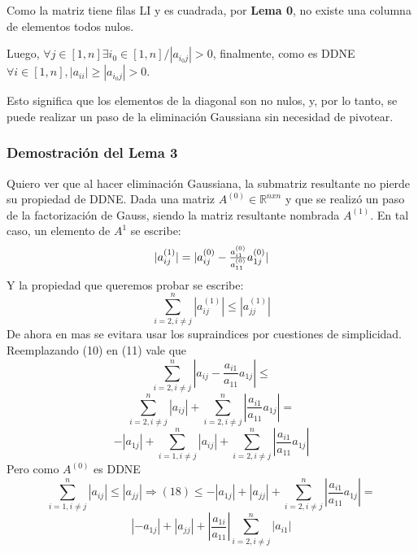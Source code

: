 Como la matriz tiene filas LI y es cuadrada, por \textbf{Lema 0}, no existe una columna de elementos todos nulos. 

Luego, $\forall j \in [1, n] \exists i_0 \in [1, n] / |a_{i_0 j}| > 0$, finalmente, como es DDNE $\forall i \in [1, n], |a_{ii}| \geq |a_{i_0 j}| > 0$. 

Esto significa que los elementos de la diagonal son no nulos, y, por lo tanto, se puede realizar un paso de la eliminación Gaussiana sin necesidad de pivotear.

\subsubsection{Demostración del Lema 3}
Quiero ver que al hacer eliminación Gaussiana, la submatriz resultante no pierde su propiedad de DDNE. Dada una matriz  $A^{(0)} \in \mathbb{R}^{nxn}$ y que se realizó un paso de la factorización de Gauss, siendo la matriz resultante nombrada $A^{(1)}$. En tal caso, un elemento de $A^{1}$ se escribe:
\\
\begin{equation*}
\centerline{$|a^{(1)}_{ij}| = |a^{(0)}_{ij} - \frac{a^{(0)}_{i1}}{a^{(0)}_{11}}  a^{(0)}_{1j}|$}
\end{equation*}
Y la propiedad que queremos probar se escribe:
\\
\begin{equation*} 
\sum_{i=2, i \neq j}^{n}  |a^{(1)}_{ij}| \leq |a^{(1)}_{jj}| 
\end{equation*}
De ahora en mas se evitara usar los supraindices por cuestiones de simplicidad. Reemplazando (10) en (11) vale que
\begin{equation*} 
\sum_{i=2, i \neq j}^{n}  |a_{ij} - \frac{a_{i1}}{a_{11}}  a_{1j}|  \leq
\end{equation*}
\begin{equation*} 
\sum_{i=2, i \neq j}^{n}  |a_{ij}| + \sum_{i=2, i \neq j}^{n}  |\frac{a_{i1}}{a_{11}}  a_{1j}|  =
\end{equation*}
\begin{equation*} 
-|a_{1j}| + \sum_{i=1, i \neq j}^{n}  |a_{ij}| + \sum_{i=2, i \neq j}^{n}  |\frac{a_{i1}}{a_{11}}  a_{1j}|
\end{equation*}
Pero como $A^{(0)}$ es DDNE
\begin{equation*} 
\sum_{i=1, i \neq j}^{n}  |a_{ij}|  \leq |a_{jj}| \Rightarrow (18) \leq  -|a_{1j}| + |a_{jj}| + \sum_{i=2, i \neq j}^{n} | \frac{a_{i1}}{a_{11}} a_{1j}| = 
\end{equation*}
\begin{equation*} 
|-a_{1j}| + |a_{jj}| + | \frac{a_{1i}}{a_{11}}| \sum_{i=2, i \neq j}^{n}  |a_{i1}|
\end{equation*} 

